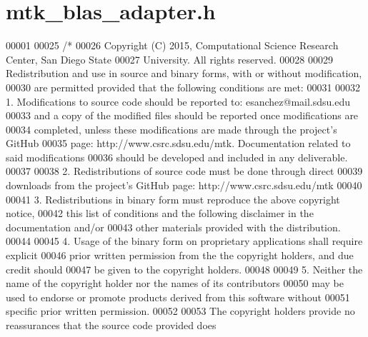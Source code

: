 \hypertarget{mtk__blas__adapter_8h_source}{\section{mtk\+\_\+blas\+\_\+adapter.\+h}
\label{mtk__blas__adapter_8h_source}
}

\begin{DoxyCode}
00001 
00025 \textcolor{comment}{/*}
00026 \textcolor{comment}{Copyright (C) 2015, Computational Science Research Center, San Diego State}
00027 \textcolor{comment}{University. All rights reserved.}
00028 \textcolor{comment}{}
00029 \textcolor{comment}{Redistribution and use in source and binary forms, with or without modification,}
00030 \textcolor{comment}{are permitted provided that the following conditions are met:}
00031 \textcolor{comment}{}
00032 \textcolor{comment}{1. Modifications to source code should be reported to: esanchez@mail.sdsu.edu}
00033 \textcolor{comment}{and a copy of the modified files should be reported once modifications are}
00034 \textcolor{comment}{completed, unless these modifications are made through the project's GitHub}
00035 \textcolor{comment}{page: http://www.csrc.sdsu.edu/mtk. Documentation related to said modifications}
00036 \textcolor{comment}{should be developed and included in any deliverable.}
00037 \textcolor{comment}{}
00038 \textcolor{comment}{2. Redistributions of source code must be done through direct}
00039 \textcolor{comment}{downloads from the project's GitHub page: http://www.csrc.sdsu.edu/mtk}
00040 \textcolor{comment}{}
00041 \textcolor{comment}{3. Redistributions in binary form must reproduce the above copyright notice,}
00042 \textcolor{comment}{this list of conditions and the following disclaimer in the documentation and/or}
00043 \textcolor{comment}{other materials provided with the distribution.}
00044 \textcolor{comment}{}
00045 \textcolor{comment}{4. Usage of the binary form on proprietary applications shall require explicit}
00046 \textcolor{comment}{prior written permission from the the copyright holders, and due credit should}
00047 \textcolor{comment}{be given to the copyright holders.}
00048 \textcolor{comment}{}
00049 \textcolor{comment}{5. Neither the name of the copyright holder nor the names of its contributors}
00050 \textcolor{comment}{may be used to endorse or promote products derived from this software without}
00051 \textcolor{comment}{specific prior written permission.}
00052 \textcolor{comment}{}
00053 \textcolor{comment}{The copyright holders provide no reassurances that the source code provided does}

\end{DoxyCode}
